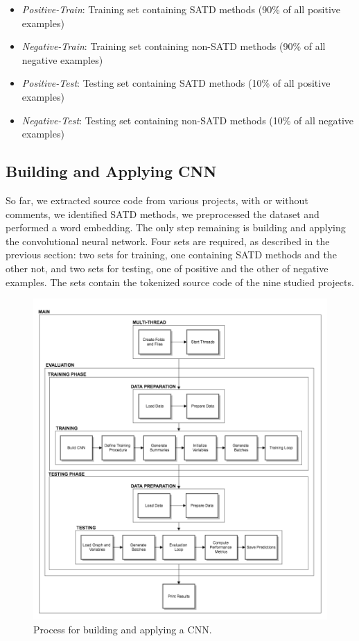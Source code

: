 \begin{itemize}
	\item \textit{Positive-Train}: Training set containing SATD methods (90\% of all positive examples)
	\item \textit{Negative-Train}: Training set containing non-SATD methods (90\% of all negative examples)
	\item \textit{Positive-Test}: Testing set containing SATD methods (10\% of all positive examples)
	\item \textit{Negative-Test}: Testing set containing non-SATD methods (10\% of all negative examples)
\end{itemize}

\subsection{Building and Applying CNN}


So far, we extracted source code from various projects, with or without comments, we identified SATD methods, we preprocessed the dataset and performed a word embedding. The only step remaining is building and applying the convolutional neural network. Four sets are required, as described in the previous section: two sets for training, one containing SATD methods and the other not, and two sets for testing, one of positive and the other of negative examples. The sets contain the tokenized source code of the nine studied projects.

\begin{figure}[t]
	\centering
	\includegraphics[width=\linewidth]{figs/CNNProcess.png}
	\caption{Process for building and applying a CNN.}
	\label{fig:CNNProcess}
	\vspace{-4mm}
\end{figure}

